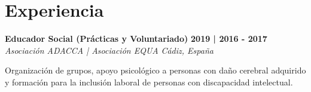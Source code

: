 \documentclass[letterpaper,11pt]{article}
\begin{document}
\section{Experiencia}

    \noindent
    \begin{minipage}[t]{0.99\textwidth}
        {\large \textbf{Educador Social (Prácticas y Voluntariado)}} 
        \hfill 
        {\small \textbf{2019 | 2016 - 2017}} \\
        
        {\color{detailgray}\textit{Asociación ADACCA | Asociación EQUA}} 
        \hfill 
        {\color{detailgray}\small \textit{Cádiz, España}}
    \end{minipage}
    
    \vspace{0.1cm}
    
    {\small Organización de grupos, apoyo psicológico a personas con daño cerebral adquirido y formación para la inclusión laboral de personas con discapacidad intelectual.}
    
    \vspace{0.4cm}



\end{document}
